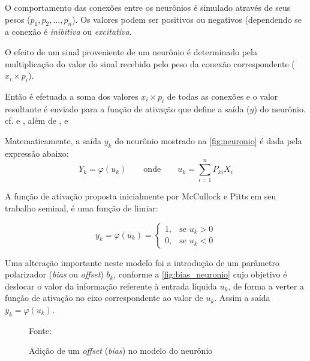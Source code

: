 O comportamento das conexões entre os neurônios é simulado através de seus pesos  ($ p_1, p_2, ..., p_n $). Os valores podem ser positivos ou negativos (dependendo se a conexão é \textit{inibitiva} ou \textit{excitativa}. 

O efeito de um sinal proveniente de um neurônio é determinado pela multiplicação do valor do sinal recebido pelo peso da conexão correspondente ($x_i \times p_i$).

Então é efetuada a soma dos valores $x_i \times p_i$ de todas as conexões e o valor resultante é enviado para a função de ativação que define a saída ($y$) do neurônio. cf.  e , além de ,  e 

Matematicamente, a saída $y_k$ do neurônio mostrado na \autoref{fig:neuronio} é dada pela expressão abaixo:
\begin{equation}
	Y_k = \varphi(u_k) \qquad \textrm{onde} \qquad u_k = \sum_{i=1}^{n} P_{ki}X_i 
\end{equation}

A função de ativação proposta inicialmente por McCullock e Pitts em seu trabalho seminal,  é uma função de limiar:

\begin{equation}\label{funcao_limiar}
y_k = \varphi (u_k) = \left \{ \begin{matrix}
									1, & \mbox{se }u_k > 0 \\ 
									0, & \mbox{se }u_k < 0 
								\end{matrix} 
							\right.
\end{equation}

Uma alteração importante neste modelo foi a introdução de um parâmetro polarizador (\textit{bias} ou \textit{offset}) $b_k$, conforme a \autoref{fig:bias_neuronio} cujo objetivo é deslocar o valor da informação referente à entrada líquida $u_k$, de forma a verter a função de ativação no eixo correspondente ao valor de $u_k$. Assim a saída $y_k = \varphi(u_k)$.

\begin{figure}[h!]
	\centering
	\caption{Adição de um \textit{offset} (\textit{bias}) no modelo do neurônio}
	
	{\scriptsize 	Fonte: }
	\label{fig:bias_neuronio}
\end{figure}

